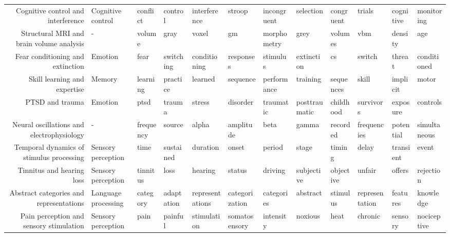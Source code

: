 \documentclass[english]{article}
\begin{document}
\begin{landscape}
\begin{supertabular}{rlllllllllll}
  Cognitive control and interference &   Cognitive control &         conflict &       control &    interference &         stroop & incongruent &      selection &     congruent &         trials &     cognitive &     monitoring \\
Structural MRI and brain volume analysis &                   - &           volume &          gray &           voxel &             gm & morphometry &           grey &       volumes &            vbm &       density &            age \\
    Fear conditioning and extinction &             Emotion &             fear &     switching &    conditioning &      responses &    stimulus &     extinction &            cs &         switch &        threat &    conditioned \\
        Skill learning and expertise &              Memory &         learning &      practice &         learned &       sequence & performance &       training &     sequences &          skill &      implicit &          motor \\
                     PTSD and trauma &             Emotion &             ptsd &        trauma &          stress &       disorder &   traumatic &  posttraumatic &     childhood &      survivors &      exposure &       controls \\
Neural oscillations and electrophysiology &                   - &        frequency &        source &           alpha &      amplitude &        beta &          gamma &      recorded &    frequencies &     potential &   simultaneous \\
Temporal dynamics of stimulus processing &  Sensory perception &             time &     sustained &        duration &          onset &      period &          stage &        timing &          delay &     transient &          event \\
           Tinnitus and hearing loss &  Sensory perception &         tinnitus &          loss &         hearing &         status &     driving &     subjective &     objective &         unfair &        offers &      rejection \\
Abstract categories and representations & Language processing &         category &    adaptation & representations & categorization &  categories &       abstract &      stimulus & representation &      features &      knowledge \\
Pain perception and sensory stimulation &  Sensory perception &             pain &       painful &     stimulation &  somatosensory &   intensity &        noxious &          heat &        chronic &       sensory &    nociceptive \\

\end{supertabular}
\end{landscape}
\end{document}
